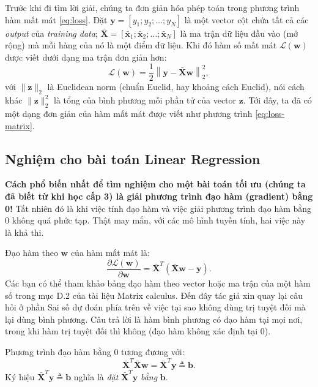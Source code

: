\documentclass[runningheads]{llncs}
\begin{document}
Trước khi đi tìm lời giải, chúng ta đơn giản hóa phép toán trong phương trình
hàm mất mát \eqref{eq:loss}. Đặt
$\mathbf{y} = [y_1; y_2; \dots; y_N]$ là một vector cột chứa tất cả các
\emph{output} của \emph{training data};
$\bar{\mathbf{X}} = [\bar{\mathbf{x}}_1; \bar{\mathbf{x}}_2; \dots;
\bar{\mathbf{x}}_N]$ là ma trận dữ liệu đầu vào (mở rộng) mà mỗi hàng của nó
là một điểm dữ liệu. Khi đó hàm số mất mát $\mathcal{L}(\mathbf{w})$ được
viết dưới dạng ma trận đơn giản hơn:
\begin{equation}
\label{eq:loss-matrix}
\mathcal{L}(\mathbf{w})
= \frac{1}{2}\left\|\mathbf{y} - \bar{\mathbf{X}}\mathbf{w}\right\|_2^2,
\end{equation}
với $\|\mathbf{z}\|_2$ là Euclidean norm (chuẩn Euclid, hay khoảng cách
Euclid), nói cách khác $\|\mathbf{z}\|_2^2$ là tổng của bình phương mỗi phần
tử của vector $\mathbf{z}$. Tới đây, ta đã có một dạng đơn giản của hàm mất
mát được viết như phương trình \eqref{eq:loss-matrix}.

\subsection{Nghiệm cho bài toán Linear Regression}

\textbf{Cách phổ biến nhất để tìm nghiệm cho một bài toán tối ưu (chúng ta đã
biết từ khi học cấp 3) là giải phương trình đạo hàm (gradient) bằng 0!} Tất
nhiên đó là khi việc tính đạo hàm và việc giải phương trình đạo hàm bằng 0
không quá phức tạp. Thật may mắn, với các mô hình tuyến tính, hai việc này là
khả thi.

Đạo hàm theo $\mathbf{w}$ của hàm mất mát là:
\[
\frac{\partial \mathcal{L}(\mathbf{w})}{\partial \mathbf{w}}
= \bar{\mathbf{X}}^T\left(\bar{\mathbf{X}}\mathbf{w} - \mathbf{y}\right).
\]
Các bạn có thể tham khảo bảng đạo hàm theo vector hoặc ma trận của một hàm số
trong mục D.2 của tài liệu Matrix calculus. Đến đây tác giả xin quay lại câu
hỏi ở phần Sai số dự đoán phía trên về việc tại sao không dùng trị tuyệt đối
mà lại dùng bình phương. Câu trả lời là hàm bình phương có đạo hàm tại mọi
nơi, trong khi hàm trị tuyệt đối thì không (đạo hàm không xác định tại 0).

Phương trình đạo hàm bằng 0 tương đương với:
\begin{equation}
\label{eq:normal}
\bar{\mathbf{X}}^T\bar{\mathbf{X}}\mathbf{w}
= \bar{\mathbf{X}}^T\mathbf{y} \triangleq \mathbf{b}.
\end{equation}
Ký hiệu $\bar{\mathbf{X}}^T\mathbf{y} \triangleq \mathbf{b}$ nghĩa là
\emph{đặt} $\bar{\mathbf{X}}^T\mathbf{y}$ \emph{bằng} $\mathbf{b}$.
\end{document}
